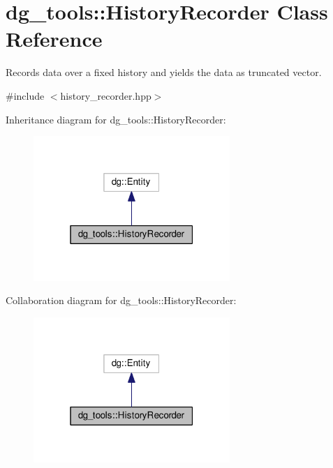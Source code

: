 \hypertarget{classdg__tools_1_1HistoryRecorder}{}\section{dg\+\_\+tools\+:\+:History\+Recorder Class Reference}
\label{classdg__tools_1_1HistoryRecorder}


Records data over a fixed history and yields the data as truncated vector.  




{\ttfamily \#include $<$history\+\_\+recorder.\+hpp$>$}



Inheritance diagram for dg\+\_\+tools\+:\+:History\+Recorder\+:
\nopagebreak
\begin{figure}[H]
\begin{center}
\leavevmode
\includegraphics[width=211pt]{classdg__tools_1_1HistoryRecorder__inherit__graph}
\end{center}
\end{figure}


Collaboration diagram for dg\+\_\+tools\+:\+:History\+Recorder\+:
\nopagebreak
\begin{figure}[H]
\begin{center}
\leavevmode
\includegraphics[width=211pt]{classdg__tools_1_1HistoryRecorder__coll__graph}
\end{center}
\end{figure}
